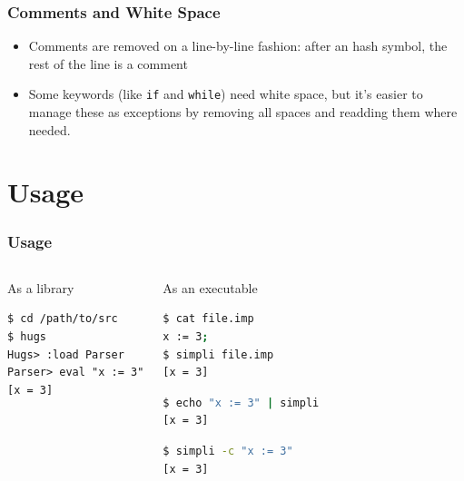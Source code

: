 \documentclass{beamer}
\begin{document}
\begin{frame}[fragile]
	\frametitle{Comments and White Space}
	\begin{itemize}
		\footnotesize
		\item Comments are removed on a line-by-line fashion: after an hash
			symbol, the rest of the line is a comment
	\end{itemize}
	
	\begin{itemize}
		\footnotesize
		\item Some keywords (like \texttt{if} and \texttt{while}) need
			white space, but it's easier to manage these as exceptions by
			removing all spaces and readding them where needed.
	\end{itemize}
	
\end{frame}

\section{Usage}
\begin{frame}[fragile]
	\frametitle{Usage}
	\begin{columns}
		\begin{block}{As a library}
\begin{lstlisting}
$ cd /path/to/src
$ hugs
Hugs> :load Parser
Parser> eval "x := 3"
[x = 3]
\end{lstlisting}
			\end{block}
		\begin{block}{As an executable}
\begin{lstlisting}[language=sh]
$ cat file.imp
x := 3;
$ simpli file.imp
[x = 3]
\end{lstlisting}
\begin{lstlisting}[language=sh]
$ echo "x := 3" | simpli
[x = 3]
\end{lstlisting}
\begin{lstlisting}[language=sh]
$ simpli -c "x := 3"
[x = 3]
\end{lstlisting}
		\end{block}
	\end{columns}
\end{frame}

\end{document}
